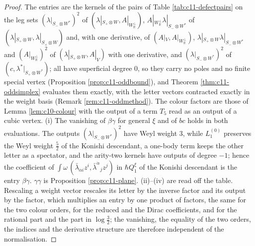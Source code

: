 \begin{proof}
The entries are the kernels of the pairs of Table \ref{tab:c11-defectpairs} on the leg sets $(\lambda|_{S_-\otimes W^*})^2$ of $(\lambda|_{S_+\otimes W},A|_{W_{\mathbb R}^\perp})$, $A|_{W_{\mathbb R}^\perp}\lambda|_{S_-\otimes W^*}$ of $(\lambda|_{S_+\otimes W},\lambda|_{S_+\otimes W})$ and, with one derivative, of $(A|_V,A|_{W_{\mathbb R}^\perp})$, $\lambda|_{S_+\otimes W}\lambda|_{S_-\otimes W^*}$ and $(A|_{W_{\mathbb R}^\perp})^2$ of $(\lambda|_{S_+\otimes W},A|_V)$ with one derivative, and $(\lambda|_{S_-\otimes W^*})^2$ of $(c,\lambda^*|_{S_+\otimes W^*})$; all have superficial degree $0$, so they carry no poles and no finite special vertex (Proposition \ref{prop:c11-oddbound}), and Theorem \ref{thm:c11-oddsimplex} evaluates them exactly, with the letter vectors contracted exactly in the weight basis (Remark \ref{rem:c11-oddmethod}). The colour factors are those of Lemma \ref{lem:c10-colour} with the output of a term $T_5$ read as an output of a cubic vertex. (i) The vanishing of $\beta\gamma$ for general $\xi$ and of $bc$ holds in both evaluations. The outputs $(\lambda|_{S_-\otimes W^*})^2$ have Weyl weight $3$, while $L_1^{(0)}$ preserves the Weyl weight $\tfrac52$ of the Konishi descendant, a one-body term keeps the other letter as a spectator, and the arity-two kernels have outputs of degree $-1$; hence the coefficient of $\int\omega\,(\bar\lambda_{\dot\alpha i}z^i,\bar\lambda^{\dot\alpha}{}_jz^j)$ in $\hbar Q^\xi_1$ of the Konishi descendant is the entry $\beta\gamma$. $\gamma\gamma$ is Proposition \ref{prop:c11-plane}. (ii)--(iv) are read off the table. Rescaling a weight vector rescales its letter by the inverse factor and its output by the factor, which multiplies an entry by one product of factors, the same for the two colour orders, for the reduced and the Dirac coefficients, and for the rational part and the part in $\log\tfrac32$; the vanishing, the equality of the two orders, the indices and the derivative structure are therefore independent of the normalisation.
\end{proof}

